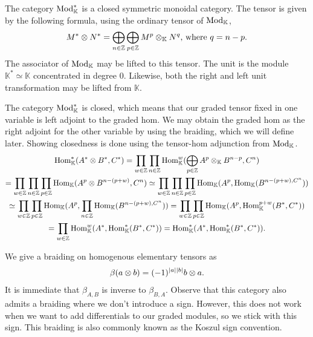 \documentclass[../thesis.tex]{subfiles}
\begin{document}
            The category $\tt{Mod}_\mathbb{K}^*$ is a closed symmetric monoidal category. The tensor is given by the following formula, using the ordinary tensor of $\tt{Mod}_\mathbb{K}$,
            \begin{align*}
                M^*\otimes N^* = \bigoplus_{n\in \mathbb{Z}}\bigoplus_{p\in\mathbb{Z}}M^p\otimes_\mathbb{K} N^q\tt{, where }q = n - p\tt{.}
            \end{align*}
            The associator of $\tt{Mod}_\mathbb{K}$ may be lifted to this tensor. The unit is the module $\mathbb{K}^* \simeq \mathbb{K}$ concentrated in degree $0$. Likewise, both the right and left unit transformation may be lifted from $\mathbb{K}$. 
            
            The category $\tt{Mod}_\mathbb{K}^*$ is closed, which means that our graded tensor fixed in one variable is left adjoint to the graded hom. We may obtain the graded hom as the right adjoint for the other variable by using the braiding, which we will define later. Showing closedness is done using the tensor-hom adjunction from $\tt{Mod}_\mathbb{K}$.
            \begin{multline*}
                \tt{Hom}_\mathbb{K}^*(A^*\otimes B^*, C^*) = \prod_{w\in\mathbb{Z}}\prod_{n\in\mathbb{Z}}\tt{Hom}_\mathbb{K}^w(\bigoplus_{p\in\mathbb{Z}}A^p\otimes_\mathbb{K}B^{n-p},C^n) \\
                = \prod_{w\in\mathbb{Z}}\prod_{n\in\mathbb{Z}}\prod_{p\in\mathbb{Z}}\tt{Hom}_\mathbb{K}(A^p\otimes B^{n-(p+w)},C^n) \simeq \prod_{w\in\mathbb{Z}}\prod_{n\in\mathbb{Z}}\prod_{p\in\mathbb{Z}}\tt{Hom}_\mathbb{K}(A^p,\tt{Hom}_\mathbb{K}(B^{n-(p+w),C^n})) \\
                \simeq \prod_{w\in\mathbb{Z}}\prod_{p\in\mathbb{Z}}\tt{Hom}_\mathbb{K}(A^p, \prod_{n\in\mathbb{Z}}\tt{Hom}_\mathbb{K}(B^{n-(p+w),C^n})) = \prod_{w\in\mathbb{Z}}\prod_{p\in\mathbb{Z}}\tt{Hom}_\mathbb{K}(A^p,\tt{Hom}_\mathbb{K}^{p+w}(B^*,C^*)) \\
                = \prod_{w\in\mathbb{Z}}\tt{Hom}_\mathbb{K}^w(A^*,\tt{Hom}_\mathbb{K}^*(B^*,C^*)) = \tt{Hom}_\mathbb{K}^*(A^*,\tt{Hom}_\mathbb{K}^*(B^*,C^*))\tt{.}
            \end{multline*}
            
            We give a braiding on homogenous elementary tensors as
            \begin{align*}
                \beta(a\otimes b) = (-1)^{|a||b|}b\otimes a\tt{.}
            \end{align*}
            It is immediate that $\beta_{A,B}$ is inverse to $\beta_{B,A}$. Observe that this category also admits a braiding where we don't introduce a sign. However, this does not work when we want to add differentials to our graded modules, so we stick with this sign. This braiding is also commonly known as the Koszul sign convention. 
\end{document}

